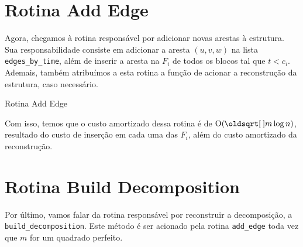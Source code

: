 \section{Rotina Add Edge}
\label{sec:rmsf-add-edge}

Agora, chegamos à rotina responsável por adicionar novas arestas à estrutura. Sua responsabilidade consiste em adicionar a aresta $(u,v,w)$ na lista \texttt{edges\_by\_time}, além de inserir a aresta na $F_i$ de todos os blocos tal que $t < c_i$. Ademais, também atribuímos a esta rotina a função de acionar a reconstrução da estrutura, caso necessário.

\begin{algorithm}[h!]
    \caption{Rotina Add Edge}\label{rmsf-add-edge}
    \begin{algorithmic}[1]
        \EndFor
        \EndIf
        \EndFunction
    \end{algorithmic}
\end{algorithm}

Com isso, temos que o custo amortizado dessa rotina é de $\Oh(\sqrt{m} \log{n})$, resultado do custo de inserção em cada uma das $F_i$, além do custo amortizado da reconstrução.

\section{Rotina Build Decomposition}
\label{sec:rmsf-build-decomposition}

Por último, vamos falar da rotina responsável por reconstruir a decomposição, a \texttt{build\_decomposition}. Este método é ser acionado pela rotina \texttt{add\_edge} toda vez que $m$ for um quadrado perfeito.


